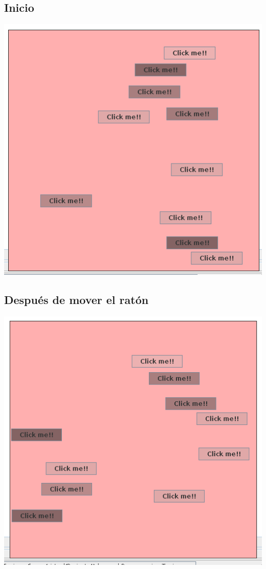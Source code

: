 \documentclass[12pt]{article}
\begin{document}
\subsection*{Inicio}
\includegraphics[width=\textwidth]{Ejecucion1.png}

\subsection*{Después de mover el ratón}
\includegraphics[width=\textwidth]{Ejecucion2.png}
\end{document}
